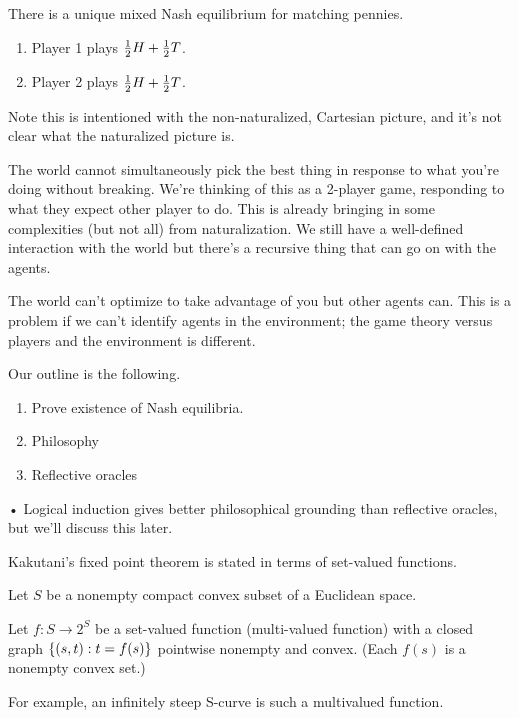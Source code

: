 \documentclass[11pt]{article}
\begin{document}
There is a unique mixed Nash equilibrium for matching pennies. 
\begin{enumerate}
\item
Player 1 plays $\frac{1}{2} H + \frac{1}{2} T$.
\item
Player 2 plays $\frac{1}{2} H + \frac{1}{2} T$.
\end{enumerate}

Note this is intentioned with the non-naturalized, Cartesian picture, and it's not clear what the naturalized picture is.


The world cannot simultaneously pick the best thing in response to what you're doing without breaking.
We're thinking of this as a 2-player game, responding to what they expect other player to do. This is already bringing in some complexities (but not all) from naturalization. We still have a well-defined interaction with the world but there's a recursive thing that can go on with the agents.

The world can't optimize to take advantage of you but other agents can. This is a problem if we can't identify agents in the environment; the game theory versus players and the environment is different.

Our outline is the following.
\begin{enumerate}
\item
Prove existence of Nash equilibria.
\item
Philosophy
\item
Reflective oracles
\end{enumerate}•
Logical induction gives better philosophical grounding than reflective oracles, but we'll discuss this later.


Kakutani's fixed point theorem is stated in terms of set-valued functions.
\begin{thm}
Let $S$ be a nonempty compact convex subset of a Euclidean space.

Let $f:S\to 2^S$ be a set-valued function (multi-valued function) with a closed graph $\left\{{(s,t)}:{t=f(s)}\right\}$ pointwise nonempty and convex. (Each $f(s)$ is a nonempty convex set.)
\end{thm}
For example, an infinitely steep S-curve is such a multivalued function.
\end{document}
